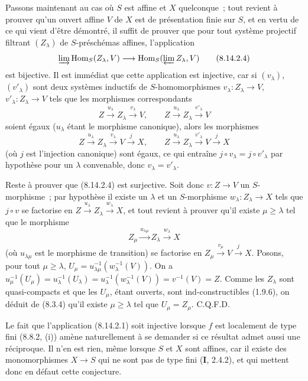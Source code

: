 Passons maintenant au cas où $S$ est affine et $X$ quelconque~; tout revient à
prouver qu'un ouvert affine $V$ de $X$ est de présentation finie sur $S$, et
en vertu de ce qui vient d'être démontré, il suffit de prouver que pour tout
système projectif filtrant $(Z_\lambda)$ de $S$-préschémas affines,
l'application
\begin{equation}
\label{IV.8.14.2.4-fr}
\varinjlim\operatorname{Hom}_S(Z_\lambda,V)
\longrightarrow
\operatorname{Hom}_S(\varprojlim Z_\lambda,V) \tag{8.14.2.4}
\end{equation}
est bijective. Il est immédiat que cette application est injective, car si
$(v_\lambda)$, $(v'_\lambda)$ sont deux systèmes inductifs de
$S$-homomorphismes $v_\lambda:Z_\lambda\to V$,
$v'_\lambda:Z_\lambda\to V$ tels que les morphismes correspondants
\[
Z\xrightarrow{u_\lambda}Z_\lambda\xrightarrow{v_\lambda}V,
\qquad
Z\xrightarrow{u_\lambda}Z_\lambda\xrightarrow{v'_\lambda}V
\]
soient égaux ($u_\lambda$ étant le morphisme canonique), alors les morphismes
\[
Z\xrightarrow{u_\lambda}Z_\lambda\xrightarrow{v_\lambda}V
\xrightarrow{j}X,
\qquad
Z\xrightarrow{u_\lambda}Z_\lambda\xrightarrow{v'_\lambda}V
\xrightarrow{j}X
\]
(où $j$ est l'injection canonique) sont égaux, ce qui entraîne
$j\circ v_\lambda=j\circ v'_\lambda$ par hypothèse pour un $\lambda$
convenable, donc $v_\lambda=v'_\lambda$.

Reste à prouver que (8.14.2.4) est surjective. Soit donc $v:Z\to V$ un
$S$-morphisme~; par hypothèse il existe un $\lambda$ et un $S$-morphisme
$w_\lambda:Z_\lambda\to X$ tels que $j\circ v$ se factorise en
$Z\xrightarrow{u_\lambda}Z_\lambda\xrightarrow{w_\lambda}X$,
et tout revient à prouver qu'il existe $\mu\geqslant\lambda$ tel que le
morphisme
\[
Z_\mu\xrightarrow{u_{\lambda\mu}}Z_\lambda
\xrightarrow{w_\lambda}X
\]
(où $u_{\lambda\mu}$ est le morphisme de transition) se factorise en
$Z_\mu\xrightarrow{v_\mu}V\xrightarrow{j}X$.
Posons, pour tout $\mu\geqslant\lambda$,
$U_\mu=u_{\lambda\mu}^{-1}(w_\lambda^{-1}(V))$. On a
$u_\mu^{-1}(U_\mu)=u_\lambda^{-1}(U_\lambda)
=u_\lambda^{-1}(w_\lambda^{-1}(V))=v^{-1}(V)=Z$.
Comme les $Z_\lambda$ sont quasi-compacts et que les $U_\mu$, étant ouverts,
sont ind-constructibles (1.9.6), on déduit de (8.3.4) qu'il existe
$\mu\geqslant\lambda$ tel que $U_\mu=Z_\mu$. C.Q.F.D.

\begin{remark}[8.14.3]
\label{IV.8.14.3-fr}
Le fait que l'application (8.14.2.1) soit injective lorsque $f$ est localement
de type fini (8.8.2, (i)) amène naturellement à se demander si ce résultat
admet aussi une réciproque. Il n'en est rien, même lorsque $S$ et $X$ sont
affines, car il existe des monomorphismes $X\to S$ qui ne sont pas de type fini
(\textbf{I}, 2.4.2), et qui mettent donc en défaut cette conjecture.
\end{remark}
